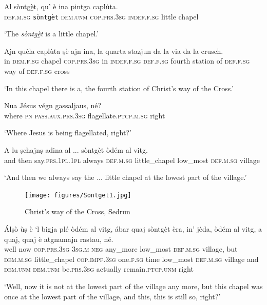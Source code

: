 \begin{linenumbers}
\gll Al sòntgè̱t, qu’ è ina pintga caplùta.\\
 \textsc{def.m.sg} \texttt{sòntgèt} \textsc{dem.unm} \textsc{cop.prs.3sg} \textsc{indef.f.sg} little chapel\\
\end{linenumbers}
\medskip
\glt `The \textit{sòntgè̱t} is a little chapel.'
\medskip

\begin{linenumbers}
\gll Ajn quèla caplùta ṣè ajn ina, la quarta stazjun da la via da la crusch.\\
in \textsc{dem.f.sg} chapel \textsc{cop.prs.3sg} in \textsc{indef.f.sg} \textsc{def.f.sg} fourth station of \textsc{def.f.sg} way of \textsc{def.f.sg} cross \\
\end{linenumbers}
\medskip
\glt `In this chapel there is a, the fourth station of Christ’s way of the Cross.'
\medskip

\begin{linenumbers}
\gll  Nua\footnotemark{} Jésus végn gassaljaus, né?  \\
where \textsc{pn} \textsc{pass.aux.prs.3sg} flagellate.\textsc{ptcp.m.sg} right \\
\end{linenumbers}
\medskip
\glt `Where Jesus is being flagellated, right?'
\medskip

\begin{linenumbers}
\gll A lu ṣchajnṣ adina al ... sòntgè̱t òdém al vitg.\\
and then say.\textsc{prs.1pl.1pl} always \textsc{def.m.sg} {} little\_chapel low\_most \textsc{def.m.sg} village\\
\end{linenumbers}
\medskip
\glt `And then we always say the ... little chapel at the lowest part of the village.'
\medskip

\begin{figure}
	\texttt{[image: figures/Sontget1.jpg]}
	\caption{Christ's way of the Cross, Sedrun}
\end{figure}


\begin{linenumbers}
\gll  Álṣò ùṣ è `l bigja plé òdém al vitg, ábar quaj sòntgè̱t èra, in’ jèda, òdém al vitg, a quaj, quaj è atgnamajn rastau, né. \\
well now  \textsc{cop.prs.3sg} \textsc{3sg.m} \textsc{neg} any\_more low\_most \textsc{def.m.sg} village, but \textsc{dem.m.sg} little\_chapel \textsc{cop.impf.3sg} one.\textsc{f.sg} time low\_most \textsc{def.m.sg} village and \textsc{dem.unm} \textsc{dem.unm} be.\textsc{prs.3sg} actually remain.\textsc{ptcp.unm} right\\
\end{linenumbers}
\medskip
\glt `Well, now it is not at the lowest part of the village any more, but this chapel was once at the lowest part of the village, and this, this is still so, right?'
\medskip

